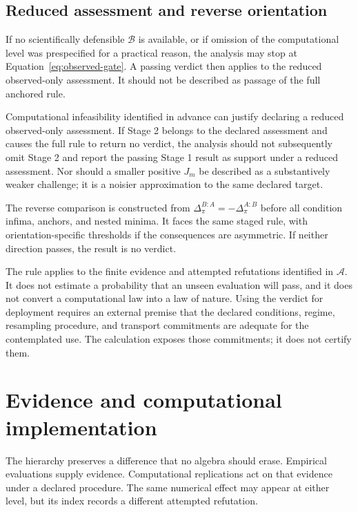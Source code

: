 \documentclass[11pt]{article}
\newcommand{\Assess}{\mathcal{A}}
\newcommand{\Boot}{\mathcal{B}}
\theoremstyle{remark}
\begin{document}
\subsection{Reduced assessment and reverse orientation}

If no scientifically defensible $\Boot$ is available, or if omission of the
computational level was prespecified for a practical reason, the analysis may
stop at Equation~\eqref{eq:observed-gate}. A passing verdict then applies to
the reduced observed-only assessment. It should not be described as passage of
the full anchored rule.

Computational infeasibility identified in advance can justify declaring a
reduced observed-only assessment. If Stage 2 belongs to the declared
assessment and causes the full rule to return no verdict, the analysis should
not subsequently omit Stage 2 and report the passing Stage 1 result as support
under a reduced assessment. Nor should a smaller positive $J_m$ be described
as a substantively weaker challenge; it is a noisier approximation to the same
declared target.

The reverse comparison is constructed from
$\Delta^{B:A}_\pi=-\Delta^{A:B}_\pi$ before all condition infima, anchors,
and nested minima. It faces the same staged rule, with orientation-specific
thresholds if the consequences are asymmetric. If neither direction passes,
the result is no verdict.

The rule applies to the finite evidence and attempted refutations identified
in $\Assess$. It does not estimate a probability that an unseen
evaluation will pass, and it does not convert a computational law into a law of
nature. Using the verdict for deployment requires an external premise that the
declared conditions, regime, resampling procedure, and transport commitments
are adequate for the contemplated use. The calculation exposes those
commitments; it does not certify them.

\section{Evidence and computational implementation}
\label{sec:evidence}

The hierarchy preserves a difference that no algebra should erase. Empirical
evaluations supply evidence. Computational replications act on that evidence
under a declared procedure. The same numerical effect may appear at either
level, but its index records a different attempted refutation.
\end{document}
